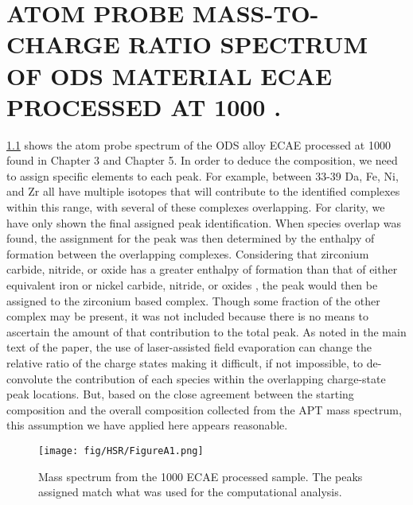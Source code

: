 \chapter{ATOM PROBE MASS-TO-CHARGE RATIO SPECTRUM OF ODS MATERIAL ECAE PROCESSED AT 1000 \celsius.}




\ref{fig:HSRA1} shows the atom probe spectrum of the ODS alloy ECAE processed at 1000 \celsius{} found in Chapter 3 and Chapter 5. In order to deduce the composition, we need to assign specific elements to each peak.  For example, between 33-39 Da, Fe, Ni, and Zr all have multiple isotopes that will contribute to the identified complexes within this range, with several of these complexes overlapping. For clarity, we have only shown the final assigned peak identification. When species overlap was found, the assignment for the peak was then determined by the enthalpy of formation between the overlapping complexes. Considering that zirconium carbide, nitride, or oxide has a greater enthalpy of formation than that of either equivalent iron or nickel carbide, nitride, or oxides \cite{RN3452,RN413,RN557,RN3453,RN3454,}, the peak would then be assigned to the zirconium based complex. Though some fraction of the other complex may be present, it was not included because there is no means to ascertain the amount of that contribution to the total peak. As noted in the main text of the paper, the use of laser-assisted field evaporation can change the relative ratio of the charge states making it difficult, if not impossible, to de-convolute the contribution of each species within the overlapping charge-state peak locations. But, based on the close agreement between the starting composition and the overall composition collected from the APT mass spectrum, this assumption we have applied here appears reasonable.

\begin{figure}
	\centering
	\texttt{[image: fig/HSR/FigureA1.png]}
	\caption[Mass spectrum from the 1000 \celsius{} ECAE processed sample.]{Mass spectrum from the 1000 \celsius{} ECAE processed sample. The peaks assigned match what was used for the computational analysis.}
	\label{fig:HSRA1}
\end{figure}